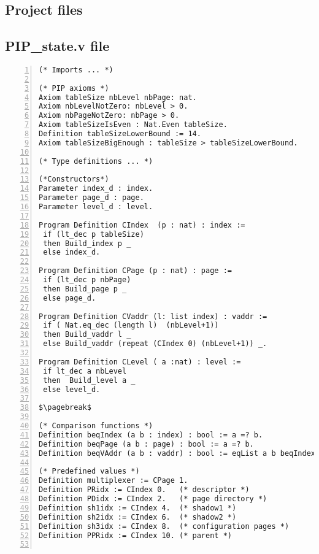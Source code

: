 \begin{appendices}

\chapter{Project files}

\section{PIP\_state.v file} \label{stateFile}
\begin{lstlisting}[caption = {PIP\_state.v file},xleftmargin=-.1\textwidth,
xrightmargin=-.1\textwidth,
mathescape=true,numbers=left]
(* Imports ... *)

(* PIP axioms *)
Axiom tableSize nbLevel nbPage: nat.
Axiom nbLevelNotZero: nbLevel > 0.
Axiom nbPageNotZero: nbPage > 0.
Axiom tableSizeIsEven : Nat.Even tableSize.
Definition tableSizeLowerBound := 14.  
Axiom tableSizeBigEnough : tableSize > tableSizeLowerBound. 

(* Type definitions ... *)

(*Constructors*)
Parameter index_d : index.
Parameter page_d : page.
Parameter level_d : level.

Program Definition CIndex  (p : nat) : index := 
 if (lt_dec p tableSize) 
 then Build_index p _ 
 else index_d.

Program Definition CPage (p : nat) : page := 
 if (lt_dec p nbPage) 
 then Build_page p _ 
 else page_d.

Program Definition CVaddr (l: list index) : vaddr := 
 if ( Nat.eq_dec (length l)  (nbLevel+1))  
 then Build_vaddr l _
 else Build_vaddr (repeat (CIndex 0) (nbLevel+1)) _.

Program Definition CLevel ( a :nat) : level := 
 if lt_dec a nbLevel 
 then  Build_level a _ 
 else level_d.

$\pagebreak$

(* Comparison functions *)
Definition beqIndex (a b : index) : bool := a =? b.
Definition beqPage (a b : page) : bool := a =? b.
Definition beqVAddr (a b : vaddr) : bool := eqList a b beqIndex.

(* Predefined values *)
Definition multiplexer := CPage 1.
Definition PRidx := CIndex 0.   (* descriptor *)
Definition PDidx := CIndex 2.   (* page directory *)
Definition sh1idx := CIndex 4.  (* shadow1 *) 
Definition sh2idx := CIndex 6.  (* shadow2 *)
Definition sh3idx := CIndex 8.  (* configuration pages *)
Definition PPRidx := CIndex 10. (* parent *)


\end{lstlisting}
\end{appendices}
